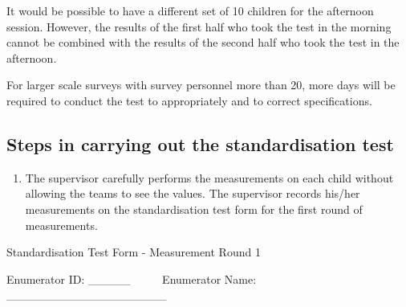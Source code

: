 \documentclass[12pt,a4paper]{book}
\providecommand{\tightlist}{%
  \setlength{\itemsep}{0pt}\setlength{\parskip}{0pt}}
\theoremstyle{definition}
\theoremstyle{definition}
\theoremstyle{definition}
\theoremstyle{remark}
\begin{document}
It would be possible to have a different set of 10 children for the
afternoon session. However, the results of the first half who took the
test in the morning cannot be combined with the results of the second
half who took the test in the afternoon.

For larger scale surveys with survey personnel more than 20, more days
will be required to conduct the test to appropriately and to correct
specifications.

\hypertarget{steps-in-carrying-out-the-standardisation-test}{%
\subsection{Steps in carrying out the standardisation
test}\label{steps-in-carrying-out-the-standardisation-test}}

\begin{enumerate}
\def\labelenumi{\arabic{enumi}.}
\tightlist
\item
  The supervisor carefully performs the measurements on each child
  without allowing the teams to see the values. The supervisor records
  his/her measurements on the standardisation test form for the first
  round of measurements.
\end{enumerate}

Standardisation Test Form - Measurement Round 1

Enumerator ID: \_\_\_\_\_ ~ ~ ~ Enumerator Name:
\_\_\_\_\_\_\_\_\_\_\_\_\_\_\_\_\_\_\_
\end{document}
